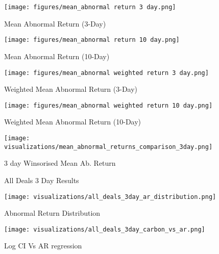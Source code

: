 \documentclass[a4paper]{article}
\begin{document}
\begin{figure}[htbp]
\centering
    \begin{minipage}{0.48\textwidth}
        \centering
        \texttt{[image: figures/mean\_abnormal return 3 day.png]}
        \caption{Mean Abnormal Return (3-Day)}
        \label{fig:3day_MAR}
    \end{minipage}
    \hfill
    \begin{minipage}{0.48\textwidth}
        \centering
        \texttt{[image: figures/mean\_abnormal return 10 day.png]}
        \caption{Mean Abnormal Return (10-Day)}
        \label{fig:10day_MAR}
    \end{minipage}
\end{figure}

\begin{figure}[htbp]
   \begin{minipage}{0.48\textwidth}
        \centering
        \texttt{[image: figures/mean\_abnormal weighted return 3 day.png]}
        \caption{Weighted Mean Abnormal Return (3-Day)}
        \label{fig:3day_WMAR}
    \end{minipage}
    \hfill
    \begin{minipage}{0.48\textwidth}
        \centering
        \texttt{[image: figures/mean\_abnormal weighted return 10 day.png]}
        \caption{Weighted Mean Abnormal Return (10-Day)}
        \label{fig:10day_WMAR}
    \end{minipage}
\end{figure}

\begin{figure}[htbp]
    \centering
    \texttt{[image: visualizations/mean\_abnormal\_returns\_comparison\_3day.png]}
    \caption{3 day Winsorised Mean Ab. Return }
    \label{fig:3_WinMAR}
\end{figure}

\begin{figure}[htbp]
\caption*{All Deals 3 Day Results}
   \begin{minipage}{0.48\textwidth}
        \centering
        \texttt{[image: visualizations/all\_deals\_3day\_ar\_distribution.png]}
        \caption{Abnormal Return Distribution}
        \label{fig:3day_AWARD}
    \end{minipage}
    \hfill
    \begin{minipage}{0.48\textwidth}
        \centering
        \texttt{[image: visualizations/all\_deals\_3day\_carbon\_vs\_ar.png]}
        \caption{Log CI Vs AR regression}
        \label{fig:3day_ACIAR}
    \end{minipage}
\end{figure}
\end{document}
